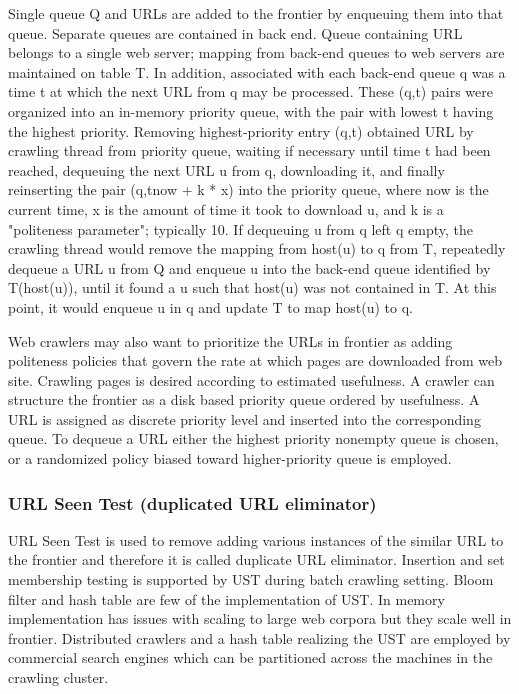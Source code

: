 \documentclass[article,type=msc,colorback,accentcolor=tud9c,twoside,11pt]{tudthesis}
\begin{document}
Single queue Q and URLs are added to the frontier by enqueuing them into that queue. Separate queues are contained in back end. Queue containing URL belongs to a single web server; mapping from back-end queues to web servers are maintained on table T. In addition, associated with each back-end queue q was a time t at which the next URL from q may be processed. These (q,t) pairs were organized into an in-memory priority queue, with the pair with lowest t having the highest priority.  Removing highest-priority entry (q,t) obtained URL by crawling thread from priority queue, waiting if necessary until time t had been reached, dequeuing the next URL u from q, downloading it, and finally reinserting the pair (q,tnow + k * x) into the priority queue, where now is the current time, x is the amount of time it took to download u, and k is a "politeness parameter"; typically 10. If dequeuing u from q left q empty, the crawling thread would remove the mapping from host(u) to q from T, repeatedly dequeue a URL u from Q and enqueue u into the back-end queue identified by T(host(u)), until it found a u such that host(u) was not contained in T. At this point, it would enqueue u in q and update T to map host(u) to q.

Web crawlers may also want to prioritize the URLs in  frontier as adding politeness policies that govern the rate at which pages are downloaded from web site. Crawling pages is desired according to estimated usefulness. A crawler can structure the frontier as a disk based priority queue ordered by usefulness. A URL is assigned as discrete priority level and inserted into the corresponding queue. To dequeue a URL either the highest priority nonempty queue is chosen, or a randomized policy biased toward higher-priority queue is employed.

\subsubsection{URL Seen Test (duplicated URL eliminator)}
URL Seen Test is used to remove adding various instances of the similar URL to the frontier and therefore it is called duplicate URL eliminator. Insertion and set membership testing is supported by UST during batch crawling setting. Bloom filter and hash table are few of the implementation of UST. In memory implementation has issues with scaling to large web corpora but they scale well in frontier. Distributed crawlers and a hash table realizing the UST are employed by commercial search engines which can be partitioned across the machines in the crawling cluster.
\end{document}
